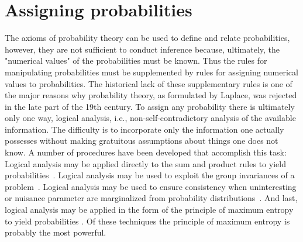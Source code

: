 \section{Assigning probabilities}
The axioms of probability theory can be used to define and relate probabilities, however, they are not sufficient to conduct inference because, ultimately, the "numerical values" of the probabilities must be known. Thus the rules for manipulating probabilities must be supplemented by rules for assigning numerical values to probabilities. The historical lack of these supplementary rules is one of the major reasons why probability theory, as formulated by Laplace, was rejected in the late part of the 19th century. To assign any probability there is ultimately only one way, logical analysis, i.e., non-self-contradictory analysis of the available information. The difficulty is to incorporate only the information one actually possesses without making gratuitous assumptions about things one does not know. A number of procedures have been developed that accomplish this task: Logical analysis may be applied directly to the sum and product rules to yield probabilities~\citep{jaynes_11}. Logical analysis may be used to exploit the group invariances of a problem~\citep{jaynes_16}. Logical analysis may be used to ensure consistency when uninteresting or nuisance parameter are marginalized from probability distributions~\citep{jaynes_21}. And last, logical analysis may be applied in the form of the principle of maximum entropy to yield probabilities \cite{zellner_bayesian_inference, jaynes_16,jaynes_19, shore_17,shore_18}. Of these techniques the principle of maximum entropy is probably the most powerful.

